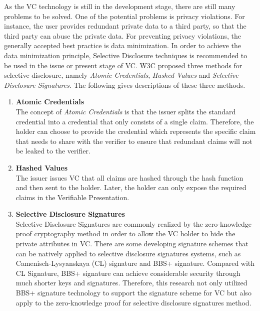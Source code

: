 \documentclass[conference, dvipdfmx]{IEEEtran} %
\begin{document}
\begin{sloppypar}
As the VC technology is still in the development stage, there are still many problems to be solved. One of the potential problems is privacy violations. For instance, the user provides redundant private data to a third party, so that the third party can abuse the private data. For preventing privacy violations, the generally accepted best practice is data minimization\cite{VC_model}. In order to achieve the data minimization principle, Selective Disclosure techniques is recommended to be used in the issue or present stage of VC. W3C proposed three methods for selective disclosure, namely \textit{Atomic Credentials}, \textit{Hashed Values} and \textit{Selective Disclosure Signatures}\cite{VC_Implementation_Guidelines}. The following gives descriptions of these three methods.
\begin{enumerate}
  \item \textbf{Atomic Credentials}\\ The concept of \textit{Atomic Credentials} is that the issuer splits the standard credential into a credential that only consists of a single claim. Therefore, the holder can choose to provide the credential which represents the specific claim that needs to share with the verifier to ensure that redundant claims will not be leaked to the verifier.
  \item \textbf{Hashed Values} \\The issuer issues VC that all claims are hashed through the hash function and then sent to the holder. 
  Later, the holder can only expose the required claims in the Verifiable Presentation.
  \item \textbf{Selective Disclosure Signatures}\\ {Selective Disclosure Signatures} are commonly realized by the zero-knowledge proof cryptography method in order to allow the VC holder to hide the private attributes in VC. There are some developing signature schemes that can be natively applied to selective disclosure signatures systems, such as Camenisch-Lysyanskaya (CL) signature\cite{cl_sig} and BBS+ signature\cite{bbs_1}. Compared with CL Signature, BBS+ signature can achieve considerable security through much shorter keys and signatures\cite{bbs_cl}. Therefore, this research not only utilized BBS+ signature technology to support the signature scheme for VC but also apply to the zero-knowledge proof for selective disclosure signatures method. 
\end{enumerate}


\end{sloppypar}
\end{document}
